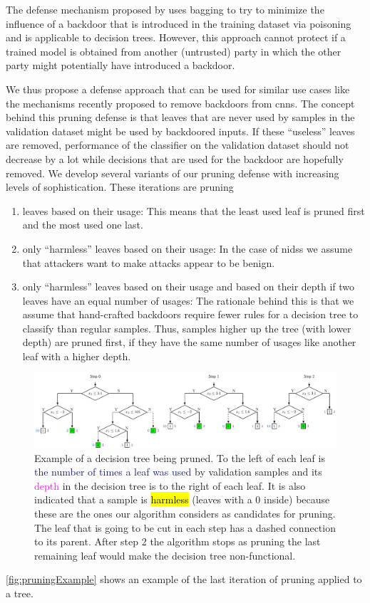 \documentclass[10pt,sigconf,letterpaper,dvipsnames]{acmart}
\begin{document}
The defense mechanism proposed by \cite{biggio_bagging_2011} uses bagging to try to minimize the influence of a backdoor that is introduced in the training dataset via poisoning and is applicable to decision trees. However, this approach cannot protect if a trained model is obtained from another (untrusted) party in which the other party might potentially have introduced a backdoor. 

We thus propose a defense approach that can be used for similar use cases like the mechanisms recently proposed to remove backdoors from \glspl{cnn}. The concept behind this pruning defense is that leaves that are never used by samples in the validation dataset might be used by backdoored inputs. If these ``useless'' leaves are removed, performance of the classifier on the validation dataset should not decrease by a lot while decisions that are used for the backdoor are hopefully removed. We develop several variants of our pruning defense with increasing levels of sophistication. These iterations are pruning
\begin{enumerate}
\item leaves based on their usage: This means that the least used leaf is pruned first and the most used one last. 
\item only ``harmless'' leaves based on their usage: In the case of \glspl{nids} we assume that attackers want to make attacks appear to be benign. 
\item only ``harmless'' leaves based on their usage and based on their depth if two leaves have an equal number of usages: The rationale behind this is that we assume that hand-crafted backdoors require fewer rules for a decision tree to classify than regular samples. Thus, samples higher up the tree (with lower depth) are pruned first, if they have the same number of usages like another leaf with a higher depth. 
\end{enumerate}
\begin{figure}[h]
\includegraphics[width=\textwidth]{pruning_example.pdf}
\caption{Example of a decision tree being pruned. To the left of each leaf is \textcolor{MidnightBlue}{the number of times a leaf was used} by validation samples and its \textcolor{Fuchsia}{depth} in the decision tree is to the right of each leaf. It is also indicated that a sample is \protect{} \hl{harmless} (leaves with a 0 inside) because these are the ones our algorithm considers as candidates for pruning. The leaf that is going to be cut in each step has a dashed connection to its parent. After step 2 the algorithm stops as pruning the last remaining leaf would make the decision tree non-functional.}
\label{fig:pruningExample}
\end{figure}
\autoref{fig:pruningExample} shows an example of the last iteration of pruning applied to a tree.
\end{document}
